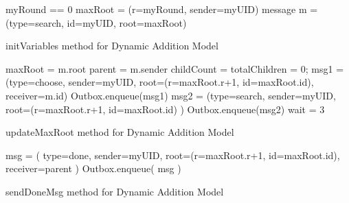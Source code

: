 \documentclass[english]{article}
\begin{document}
\begin{algorithm}[initVariables]
  myRound == 0 \;
  maxRoot = (r=myRound, sender=myUID) \; 
  message m = (type=search, id=myUID, root=maxRoot) \;
  \caption{initVariables method for Dynamic Addition Model}
\end{algorithm}

\begin{algorithm}
  maxRoot = m.root\; %
  parent = m.sender\; %
  childCount = totalChildren = 0; %
  msg1 = (type=choose, sender=myUID, root=(r=maxRoot.r+1, id=maxRoot.id), receiver=m.id) \; %
  Outbox.enqueue(msg1) \;
  msg2 = (type=search, sender=myUID, root=(r=maxRoot.r+1, id=maxRoot.id) ) \; %
  Outbox.enqueue(msg2) \;
  wait = 3 \; %
  \caption{updateMaxRoot method for Dynamic Addition Model}
\end{algorithm}

\begin{algorithm}
  msg = ( type=done, sender=myUID, root=(r=maxRoot.r+1, id=maxRoot.id), receiver=parent ) \;
  Outbox.enqueue( msg ) \;
  \caption{sendDoneMsg method for Dynamic Addition Model}
\end{algorithm}



\end{document}
